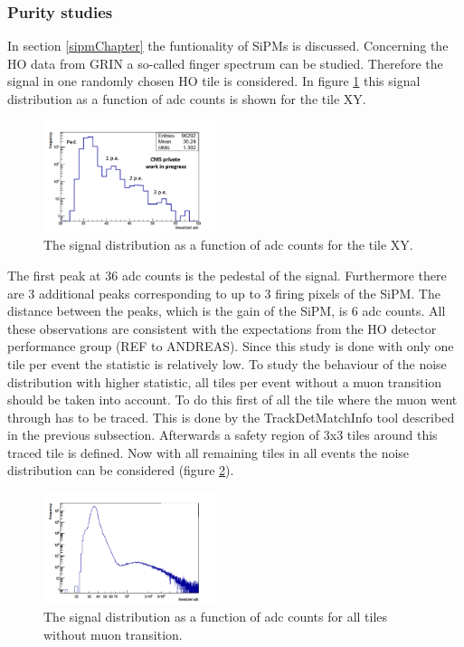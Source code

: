 		\subsubsection{Purity studies}
			In section \ref{sipmChapter} the funtionality of SiPMs is discussed.
			Concerning the HO data from GRIN a so-called finger spectrum can be studied.
			Therefore the signal in one randomly chosen HO tile is considered.
			In figure \ref{fig:noise_low} this signal distribution as a function of adc counts is shown for the tile XY.
			\begin{figure}[htbp]
				\centering
				\includegraphics[width=0.45\textwidth]{Figures/erdogan/noise_low.png}
				\caption{The signal distribution as a function of adc counts for the tile XY.}
				\label{fig:noise_low}
			\end{figure}
			The first peak at 36 adc counts is the pedestal of the signal.
			Furthermore there are 3 additional peaks corresponding to up to 3 firing pixels of the SiPM.
			The distance between the peaks, which is the gain of the SiPM, is 6 adc counts.
			All these observations are consistent with the expectations from the HO detector performance group (REF to ANDREAS).
			Since this study is done with only one tile per event the statistic is relatively low.
			To study the behaviour of the noise distribution with higher statistic, all tiles per event without a muon transition should be taken into account.
			To do this first of all the tile where the muon went through has to be traced.
			This is done by the TrackDetMatchInfo tool described in the previous subsection.
			Afterwards a safety region of 3x3 tiles around this traced tile is defined.
			Now with all remaining tiles in all events the noise distribution can be considered (figure \ref{fig:noise_high}).
			\begin{figure}[htbp]
				\centering
				\includegraphics[width=0.45\textwidth]{Figures/erdogan/noise_high.png}
				\caption{The signal distribution as a function of adc counts for all tiles without muon transition.}
				\label{fig:noise_high}
			\end{figure}
